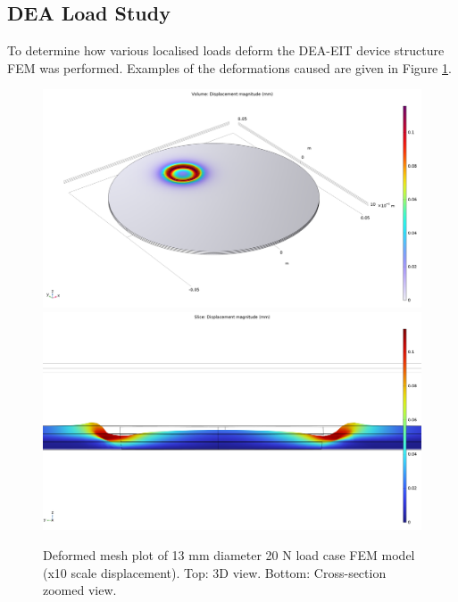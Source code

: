 \subsection{DEA Load Study}
To determine how various localised loads deform the DEA-EIT device structure FEM was performed. Examples of the deformations caused are given in Figure \ref{fig:FEM_DEA-EIT_loading}.
\begin{figure}[H]
	\centering
	\includegraphics[width=0.7\linewidth]{Figures/d13mm_load_3d_disp.png}
	\includegraphics[width=0.7\linewidth]{Figures/d13mm_load_zoom.png}
	\caption{Deformed mesh plot of 13 mm diameter 20 N load case FEM model (x10 scale displacement). Top: 3D view. Bottom: Cross-section zoomed view.}
	\label{fig:FEM_DEA-EIT_loading}
\end{figure}


